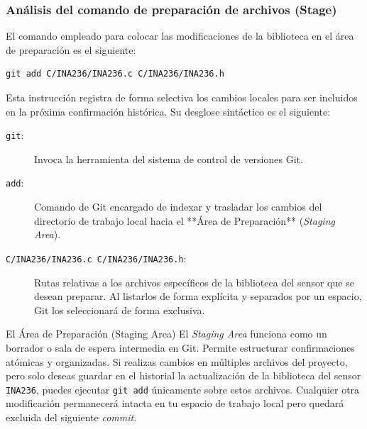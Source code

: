 \documentclass[
10pt, %
a4paper, %
oneside, %
headinclude,footinclude, %
BCOR5mm, %
]{scrartcl}
\begin{document}
\subsubsection{Análisis del comando de preparación de archivos (Stage)}

El comando empleado para colocar las modificaciones de la biblioteca en el área de preparación es el siguiente:
\begin{lstlisting}[style=CMakeStyle]
	git add C/INA236/INA236.c C/INA236/INA236.h
\end{lstlisting}

Esta instrucción registra de forma selectiva los cambios locales para ser incluidos en la próxima confirmación histórica. Su desglose sintáctico es el siguiente:

\begin{description}
	\item[\texttt{git}:] Invoca la herramienta del sistema de control de versiones Git.
	\item[\texttt{add}:] Comando de Git encargado de indexar y trasladar los cambios del directorio de trabajo local hacia el **Área de Preparación** (\textit{Staging Area}).
	\item[\texttt{C/INA236/INA236.c C/INA236/INA236.h}:] Rutas relativas a los archivos específicos de la biblioteca del sensor que se desean preparar. Al listarlos de forma explícita y separados por un espacio, Git los seleccionará de forma exclusiva.
\end{description}

\begin{InfoBox}{El Área de Preparación (Staging Area)}
	El \textit{Staging Area} funciona como un borrador o sala de espera intermedia en Git. Permite estructurar confirmaciones atómicas y organizadas. Si realizas cambios en múltiples archivos del proyecto, pero solo deseas guardar en el historial la actualización de la biblioteca del sensor \texttt{INA236}, puedes ejecutar \texttt{git add} únicamente sobre estos archivos. Cualquier otra modificación permanecerá intacta en tu espacio de trabajo local pero quedará excluida del siguiente \textit{commit}.
\end{InfoBox}

\end{document}
